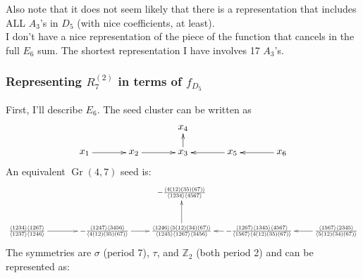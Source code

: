 \documentclass[12pt]{article}
\DeclareMathOperator{\Gr}{Gr}
\def\a{\mathcal{A}}
\def\fd5{f_{D_5}}
\def\a2{A_2}
\def\a3{A_3}
\def\d5{D_5}
\def\e6{E_6}
\def\r27{R^{(2)}_7}
\begin{document}
Also note that it does not seem likely that there is a representation that includes ALL $\a3$'s in $\d5$ (with nice coefficients, at least).\\

I don't have a nice representation of the piece of the function that cancels in the full $\e6$ sum. The shortest representation I have involves 17 $\a3$'s. 

\subsubsection*{Representing $\r27$ in terms of $\fd5$}

First, I'll describe $\e6$. The seed cluster can be written as
\begin{equation}
\begin{gathered}
\begin{xy} 0;<1pt,0pt>:<0pt,-1pt>::
	(0,25) *+{x_1} ="1",
	(50,25) *+{x_2} ="2",
	(100,25) *+{x_3} ="3",
	(100,0) *+{x_4} ="4",
	(150,25) *+{x_5} ="5",
	(200,25) *+{x_6} ="6",
	"1", {\ar"2"},
	"2", {\ar"3"},
	"3", {\ar"4"},
	"5", {\ar"3"},
	"6", {\ar"5"},
\end{xy}
\end{gathered}
\end{equation}
An equivalent $\Gr(4,7)$ seed is:
\begin{equation}
\begin{gathered}
\begin{xy} 0;<1pt,0pt>:<0pt,-1pt>::
	(0,50) *+{\frac{\langle 1234\rangle  \langle 1267\rangle }{\langle
   		1237\rangle  \langle 1246\rangle }} ="1",
	(100,50) *+{-\frac{\langle 1247\rangle  \langle 3456\rangle
 	  	}{\langle 4(12)(35)(67)\rangle }} ="2",
	(200,50) *+{\frac{\langle 1246\rangle  \langle 5(12)(34)(67)\rangle
 	  	}{\langle 1245\rangle  \langle 1267\rangle  \langle
   		3456\rangle }} ="3",
	(200,0) *+{-\frac{\langle 4(12)(35)(67)\rangle }{\langle
   		1234\rangle  \langle 4567\rangle }} ="4",
	(300,50) *+{-\frac{\langle 1267\rangle  \langle 1345\rangle  \langle
   		4567\rangle }{\langle 1567\rangle  \langle
   		4(12)(35)(67)\rangle }} ="5",
	(400,50) *+{\frac{\langle 1567\rangle  \langle 2345\rangle }{\langle
   		5(12)(34)(67)\rangle }} ="6",
	"1", {\ar"2"},
	"2", {\ar"3"},
	"3", {\ar"4"},
	"5", {\ar"3"},
	"6", {\ar"5"},
\end{xy}
\end{gathered}
\end{equation}
The symmetries are $\sigma$ (period 7), $\tau$, and $\mathbb{Z}_2$ (both period 2) and can be represented as:
\end{document}
